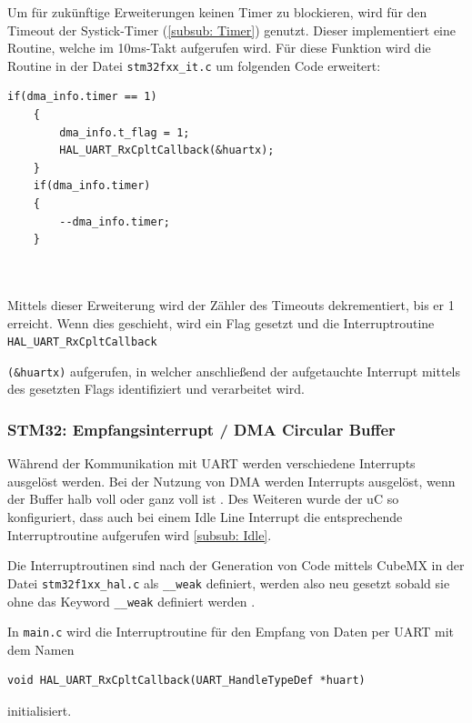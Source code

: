   \smallskip

  Um für zukünftige Erweiterungen keinen Timer zu blockieren, wird für den Timeout der Systick-Timer (\ref{subsub: Timer}) genutzt. Dieser implementiert eine Routine,
  welche im 10ms-Takt aufgerufen wird. Für diese Funktion wird die Routine in der Datei \lstinline!stm32fxx_it.c! um folgenden Code
  erweitert:

  \begin{lstlisting}[caption={\textit{Systick Timer}}]
    if(dma_info.timer == 1)
    {
        dma_info.t_flag = 1;
        HAL_UART_RxCpltCallback(&huartx);
    }
    if(dma_info.timer) 
    { 
        --dma_info.timer; 
    }



  \end{lstlisting}
  
  Mittels dieser Erweiterung wird der Zähler des Timeouts dekrementiert, bis er 1 erreicht. Wenn dies geschieht, wird ein Flag gesetzt
  und die Interruptroutine \lstinline!HAL_UART_RxCpltCallback!
  
  \lstinline!(&huartx)! aufgerufen, in welcher anschließend der aufgetauchte Interrupt mittels des
  gesetzten Flags identifiziert und verarbeitet wird.
  
\subsubsection{STM32: Empfangsinterrupt / DMA Circular Buffer}
  \label{subsub: Empfang}

  Während der Kommunikation mit \ac{UART} werden verschiedene Interrupts ausgelöst werden. Bei der Nutzung von \ac{DMA} werden Interrupts ausgelöst,
  wenn der Buffer halb voll oder ganz voll ist \citep{STM32_Ref}. Des Weiteren wurde der \ac{uC} so konfiguriert, dass auch bei einem Idle Line Interrupt
  die entsprechende Interruptroutine aufgerufen wird \ref{subsub: Idle}.

  \smallskip

  Die Interruptroutinen sind nach der Generation von Code mittels CubeMX in der Datei \lstinline!stm32f1xx_hal.c! als \lstinline!__weak!
  definiert, werden also neu gesetzt sobald sie ohne das Keyword \lstinline!__weak! definiert werden \citep{HAL_Description}. 

  \smallskip

  In \lstinline!main.c! wird die Interruptroutine für den Empfang von Daten per \ac{UART} mit dem Namen 
  \begin{lstlisting}[caption={\textit{Empfangsinterrupt}}]
    void HAL_UART_RxCpltCallback(UART_HandleTypeDef *huart)
  \end{lstlisting}
  initialisiert. 
  
